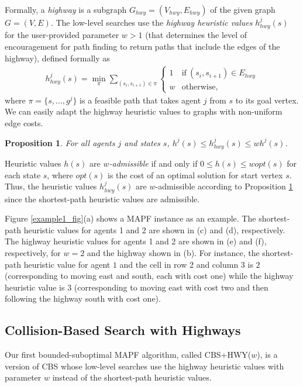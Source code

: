 \documentclass[letterpaper]{article}
\newtheorem{proposition}[theorem]{Proposition}
\theoremstyle{definition}
\begin{document}
Formally, a \emph{highway} is a subgraph $G_{hwy}=(V_{hwy},E_{hwy})$ of the
given graph $G=(V,E)$. The low-level searches use the \emph{highway heuristic
  values} $h^j_{hwy}(s)$ for the user-provided parameter $w>1$ (that
determines the level of encouragement for path finding to return paths that
include the edges of the highway), defined formally as
{ \small
\begin{align*}
h^j_{hwy}(s) = \min_{\pi} \sum_{(s_i,s_{i+1}) \in \pi} \left\{
\begin{array}{rl}
 1 & \text{if} \ (s_i,s_{i+1}) \in E_{hwy} \\
 w & \text{otherwise,}
\end{array}
\right.
\end{align*}
}
where $\pi = \{ s, \ldots, g^j \}$ is a feasible path that takes agent $j$
from $s$ to its goal vertex. We can easily adapt the highway heuristic values
to graphs with non-uniform edge costs.

\begin{proposition}
  For all agents $j$ and states $s$, $h^j(s) \leq h^j_{hwy}(s) \leq w h^j(s)$.
\label{lm:h_hwy_subopt}
\end{proposition}

Heuristic values $h(s)$ are \emph{$w$-admissible} if and only if $0 \leq h(s)
\leq w opt(s)$ for each state $s$, where $opt(s)$ is the cost of an optimal
solution for start vertex $s$. Thus, the heuristic values $h^j_{hwy}(s)$ are
$w$-admissible according to Proposition \ref{lm:h_hwy_subopt} since the
shortest-path heuristic values are admissible.

Figure \ref{example1_fig}(a) shows a MAPF instance as an example. The
shortest-path heuristic values for agents 1 and 2 are shown in (c) and (d),
respectively. The highway heuristic values for agents 1 and 2 are shown in (e)
and (f), respectively, for $w=2$ and the highway shown in (b). For instance,
the shortest-path heuristic value for agent $1$ and the cell in row 2 and
column 3 is $2$ (corresponding to moving east and south, each with cost one)
while the highway heuristic value is $3$ (corresponding to moving east with
cost two and then following the highway south with cost one).

\subsection{Collision-Based Search with Highways}

Our first bounded-suboptimal MAPF algorithm, called CBS+HWY($w$), is a version
of CBS whose low-level searches use the highway heuristic values with
parameter $w$ instead of the shortest-path heuristic values.
\end{document}
